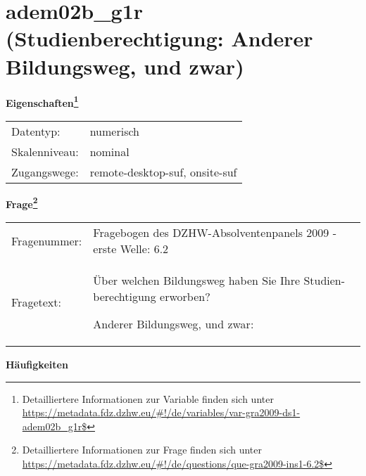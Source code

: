 
    \setcounter{footnote}{0}

    \vspace*{-1.8cm}
	\section{adem02b\_g1r (Studienberechtigung: Anderer Bildungsweg, und zwar)}
	\label{section:adem02b_g1r}



    \vspace*{0.5cm}
    \noindent\textbf{Eigenschaften\footnote{Detailliertere Informationen zur Variable finden sich unter
		\url{https://metadata.fdz.dzhw.eu/\#!/de/variables/var-gra2009-ds1-adem02b_g1r$}}}\\
	\begin{tabularx}{\hsize}{@{}lX}
	Datentyp: & numerisch \\
	Skalenniveau: & nominal \\
	Zugangswege: &
	  remote-desktop-suf, 
	  onsite-suf
 \\
    \end{tabularx}



				\vspace*{0.5cm}
                \noindent\textbf{Frage\footnote{Detailliertere Informationen zur Frage finden sich unter
		              \url{https://metadata.fdz.dzhw.eu/\#!/de/questions/que-gra2009-ins1-6.2$}}}\\
				\begin{tabularx}{\hsize}{@{}lX}
					Fragenummer: &
					  Fragebogen des DZHW-Absolventenpanels 2009 - erste Welle:
					  6.2
 \\
					Fragetext: & Über welchen Bildungsweg haben Sie Ihre Studien- berechtigung erworben?\par  Anderer Bildungsweg, und zwar: \\
				\end{tabularx}





        		\vspace*{0.5cm}
                \noindent\textbf{Häufigkeiten}


